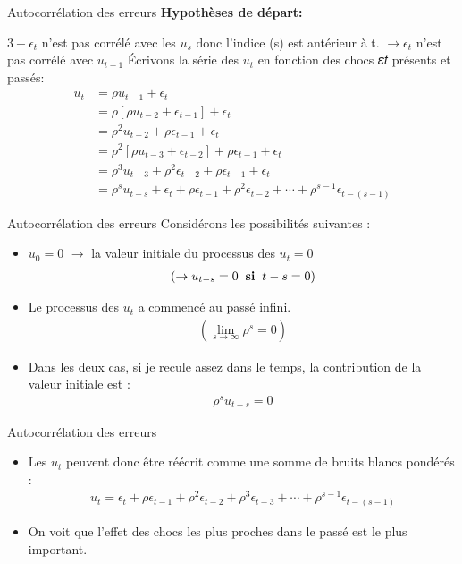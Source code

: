 \documentclass{beamer}
\begin{document}
\begin{frame}{Autocorrélation des erreurs}
\textbf{Hypothèses de départ:}
\begin{block}{$3-\epsilon_t$ n'est pas corrélé avec les $u_s$ donc l'indice (s) est antérieur à t. $\rightarrow \epsilon_t$ n'est pas corrélé avec $u_{t-1}$}
Écrivons la série des $u_t$ en fonction des chocs 𝜀𝑡 présents et passés:
\begin{align*}
u_t & =\rho u_{t-1}+\epsilon_t \\ & = \rho [\rho u_{t-2}+\epsilon_{t-1}]+\epsilon_t \\ & = \rho^2 u_{t-2}+\rho \epsilon_{t-1}+\epsilon_t \\ & = \rho^2[\rho u_{t-3}+\epsilon_{t-2}]+\rho \epsilon_{t-1}+\epsilon_t \\ & = \rho^3 u_{t-3}+\rho^2 \epsilon_{t-2}+\rho \epsilon_{t-1}+\epsilon_t \\ & = \rho^su_{t-s}+\epsilon_t+\rho \epsilon_{t-1}+\rho^2 \epsilon_{t-2}+\cdots + \rho^{s-1}\epsilon_{t-(s-1)}
\end{align*}
\end{block}
\end{frame}

\begin{frame}{Autocorrélation des erreurs}
Considérons les possibilités suivantes :
\begin{itemize}
\item $u_0=0$ $\rightarrow$ la valeur initiale du processus des $u_t=0$ 
\begin{align*}
(\rightarrow u_{t-s}=0 \hspace{0.2cm} \textbf{si} \hspace{0.2cm} t-s=0)
\end{align*}
\item Le processus des $u_t$ a commencé au passé infini.
\begin{align*}
(\lim_{s \rightarrow \infty} \rho^s=0)
\end{align*}
\item Dans les deux cas, si je recule assez dans le temps, la contribution de la valeur initiale est :
\begin{align*}
\rho^s u_{t-s}=0
\end{align*}
\end{itemize}
\end{frame}


\begin{frame}{Autocorrélation des erreurs}
\begin{itemize}
\item Les $u_t$ peuvent donc être réécrit comme une somme de bruits blancs pondérés :
\begin{align*}
u_t = \epsilon_t+\rho \epsilon_{t-1} + \rho^2 \epsilon_{t-2} + \rho^3 \epsilon_{t-3}+\cdots+\rho^{s-1}\epsilon_{t-(s-1)}
\end{align*}
\item On voit que l’effet des chocs les plus proches dans le passé est le plus important.
\end{itemize}
\end{frame}
\end{document}
